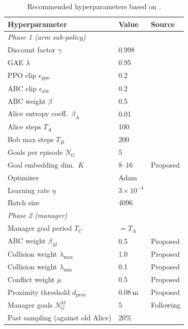 \documentclass[12pt, a4paper]{article}
\begin{document}
\begin{table}[h!]
\centering
\caption{Recommended hyperparameters based on \citet{plappert2021asymmetric,sukhbaatar2018learning}.}
\begin{tabular}{lll}
\toprule
Hyperparameter & Value & Source \\
\midrule
\multicolumn{3}{l}{\textit{Phase 1 (arm sub-policy)}} \\
Discount factor $\gamma$ & 0.998 & \cite{plappert2021asymmetric} \\
GAE $\lambda$ & 0.95 & \cite{plappert2021asymmetric} \\
PPO clip $\epsilon_{\mathrm{ppo}}$ & 0.2 & \cite{schulman2017proximal} \\
ABC clip $\epsilon_{\mathrm{abc}}$ & 0.2 & \cite{plappert2021asymmetric} \\
ABC weight $\beta$ & 0.5 & \cite{plappert2021asymmetric} \\
Alice entropy coeff.\ $\beta_A$ & 0.01 & \cite{sukhbaatar2018learning} \\
Alice steps $T_A$ & 100 & \cite{plappert2021asymmetric} \\
Bob max steps $T_B$ & 200 & \cite{plappert2021asymmetric} \\
Goals per episode $N_G$ & 5 & \cite{plappert2021asymmetric} \\
Goal embedding dim.\ $K$ & 8--16 & Proposed \\
Optimizer & Adam & \cite{kingma2014adam} \\
Learning rate $\eta$ & $3\times10^{-4}$ & \cite{plappert2021asymmetric} \\
Batch size & 4096 & \cite{plappert2021asymmetric} \\
\midrule
\multicolumn{3}{l}{\textit{Phase 2 (manager)}} \\
Manager goal period $T_C$ & $= T_A$ & \cite{sukhbaatar2018learning} \\
ABC weight $\beta_M$ & 0.5 & Proposed \\
Collision weight $\lambda_{\max}$ & 1.0 & Proposed \\
Collision weight $\lambda_{\min}$ & 0.1 & Proposed \\
Conflict weight $\mu$ & 0.5 & Proposed \\
Proximity threshold $d_{\mathrm{prox}}$ & 0.08\,m & Proposed \\
Manager goals $N_G^M$ & 5 & Following \cite{plappert2021asymmetric} \\
Past sampling (against old Alice) & 20\% & \cite{plappert2021asymmetric} \\
\bottomrule
\end{tabular}
\label{tab:hyperparams}
\end{table}
\end{document}
